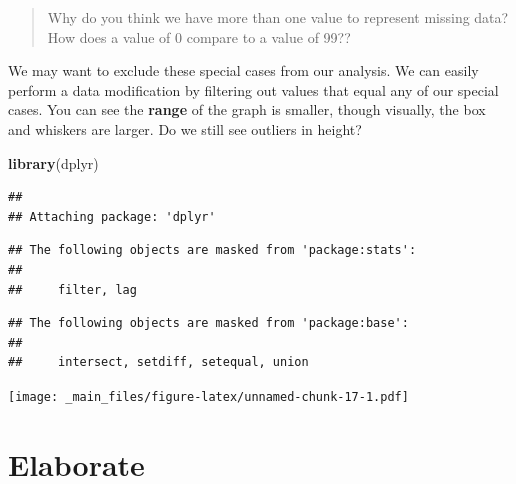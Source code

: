 \documentclass[
]{book}
\newenvironment{Shaded}{\begin{snugshade}}{\end{snugshade}}
\newcommand{\DecValTok}[1]{\textcolor[rgb]{0.00,0.00,0.81}{#1}}
\newcommand{\FunctionTok}[1]{\textcolor[rgb]{0.13,0.29,0.53}{\textbf{#1}}}
\newcommand{\NormalTok}[1]{#1}
\newcommand{\OtherTok}[1]{\textcolor[rgb]{0.56,0.35,0.01}{#1}}
\newcommand{\SpecialCharTok}[1]{\textcolor[rgb]{0.81,0.36,0.00}{\textbf{#1}}}
\begin{document}
\begin{quote}
Why do you think we have more than one value to represent missing data? How does a value of 0 compare to a value of 99??
\end{quote}

We may want to exclude these special cases from our analysis. We can easily perform a data modification by filtering out values that equal any of our special cases. You can see the \textbf{range} of the graph is smaller, though visually, the box and whiskers are larger. Do we still see outliers in height?

\begin{Shaded}
\begin{Highlighting}[]
\FunctionTok{library}\NormalTok{(dplyr)}
\end{Highlighting}
\end{Shaded}

\begin{verbatim}
## 
## Attaching package: 'dplyr'
\end{verbatim}

\begin{verbatim}
## The following objects are masked from 'package:stats':
## 
##     filter, lag
\end{verbatim}

\begin{verbatim}
## The following objects are masked from 'package:base':
## 
##     intersect, setdiff, setequal, union
\end{verbatim}

\begin{Shaded}
\end{Shaded}

\texttt{[image: \_main\_files/figure-latex/unnamed-chunk-17-1.pdf]}

\hypertarget{elaborate}{%
\section{Elaborate}\label{elaborate}}
\end{document}
